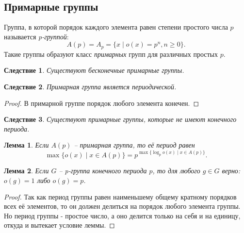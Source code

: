 \documentclass{article}
\newtheorem{corollary}{Следствие}[section]
\newtheorem{lemma}{Лемма}[section]
\begin{document}
\subsection*{Примарные группы}

Группа, в которой порядок каждого элемента равен степени простого числа $p$ называется \textit{p-группой}: $$ A(p) = A_p = \{ x \mid o(x) = p^n, n \geqslant 0 \}. $$
Такие группы образуют класс \textit{примарных} групп для различных простых $p$.


\begin{corollary}
    Существуют бесконечные примарные группы.
\end{corollary}

\begin{corollary}
    Примарная группа является периодической.
\end{corollary}

\begin{proof}
    В примарной группе порядок любого элемента конечен.
\end{proof}

\begin{corollary}
    Существуют примарные группы, которые не имеют конечного периода.
\end{corollary}

\begin{lemma} \label{prime_period}
    Если $A(p)$ -- примарная группа, то её период равен $$ \max\{ o(x) \mid x \in A(p) \} = p^{\max \{ \log_p{o(x)} \mid x \in A(p) \} }. $$
\end{lemma}

\begin{lemma}
    Если $G$ -- p-группа конечного периода $p$, то для любого $ g \in G $ верно: $o(g) = 1$ либо $o(g) = p$.
\end{lemma}

\begin{proof}
    Так как период группы равен наименьшему общему кратному порядков всех её элементов, то он должен делиться на порядок любого элемента группы. Но период группы - простое число, а оно делится только на себя и на единицу, откуда и вытекает условие леммы.
\end{proof}
\end{document}
